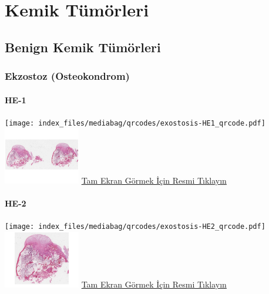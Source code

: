 \documentclass[
  letterpaper,
  DIV=11,
  numbers=noendperiod]{scrreprt}
\begin{document}
\hypertarget{sec-kemik-tumorleri}{%
\chapter{Kemik Tümörleri}\label{sec-kemik-tumorleri}}

\hypertarget{sec-benign-kemik-tumorleri}{%
\section{Benign Kemik Tümörleri}\label{sec-benign-kemik-tumorleri}}

\hypertarget{sec-ekzostoz}{%
\subsection{Ekzostoz (Osteokondrom)}\label{sec-ekzostoz}}

\hypertarget{he-1-1}{%
\subsubsection{HE-1}\label{he-1-1}}

\texttt{[image: index\_files/mediabag/qrcodes/exostosis-HE1\_qrcode.pdf]}
\href{https://images.patolojiatlasi.com/exostosis/oc.html}{\includegraphics[width=0.25\textwidth,height=\textheight]{./screenshots/thumbnail_exostosis-1.png}}
\href{https://images.patolojiatlasi.com/exostosis/oc.html}{Tam Ekran
Görmek İçin Resmi Tıklayın}

\hypertarget{he-2-1}{%
\subsubsection{HE-2}\label{he-2-1}}

\texttt{[image: index\_files/mediabag/qrcodes/exostosis-HE2\_qrcode.pdf]}
\href{https://images.patolojiatlasi.com/exostosis/HE.html}{\includegraphics[width=0.25\textwidth,height=\textheight]{./screenshots/thumbnail_exostosis-2.png}}
\href{https://images.patolojiatlasi.com/exostosis/oc001.html}{Tam Ekran
Görmek İçin Resmi Tıklayın}
\end{document}
